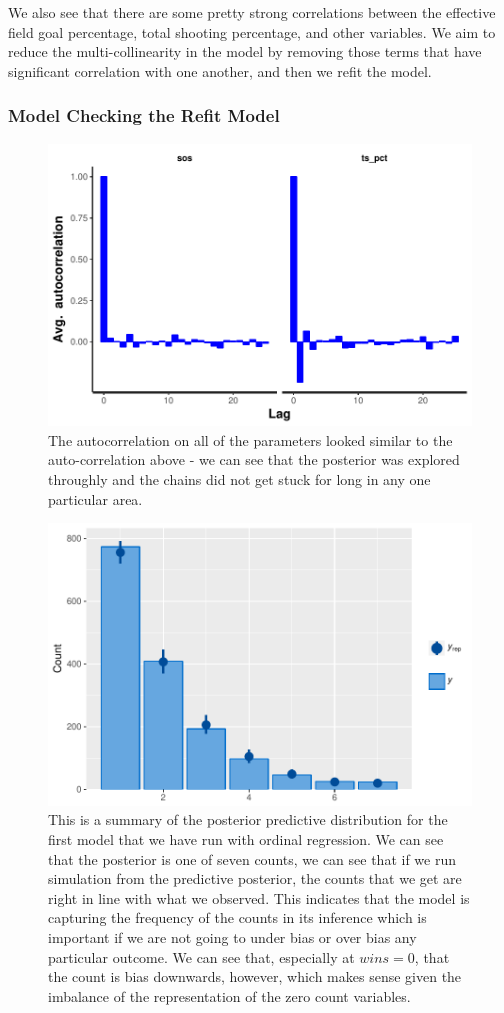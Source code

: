 \documentclass[10pt,a4paper, hidelinks]{article} %
\begin{document}
We also see that there are some pretty strong correlations between the effective field goal percentage, total shooting percentage, and other variables. We aim to reduce the multi-collinearity in the model by removing those terms that have significant correlation with one another, and then we refit the model. 

\subsubsection{Model Checking the Refit Model}
\begin{figure}[H]
	\centering
	\includegraphics[width=.6\linewidth]{../fig/polr_autocorr}
	\caption{The autocorrelation on all of the parameters looked similar to the auto-correlation above - we can see that the posterior was explored throughly and the chains did not get stuck for long in any one particular area. }
	\label{fig:polr_autocorrelation}
\end{figure}


\begin{figure}[H]
	\centering
	\includegraphics[width=0.7\linewidth]{../fig/polr_nonames_pp}
	\caption{This is a summary of the posterior predictive distribution for the first model that we have run with ordinal regression. We can see that the posterior is one of seven counts, we can see that if we run simulation from the predictive posterior, the counts that we get are right in line with what we observed. This indicates that the model is capturing the frequency of the counts in its inference which is important if we are not going to under bias or over bias any particular outcome. We can see that, especially at $wins = 0$, that the count is bias downwards, however, which makes sense given the imbalance of the representation of the zero count variables.}
	\label{fig:polrnonamespp}
\end{figure}
\end{document}

